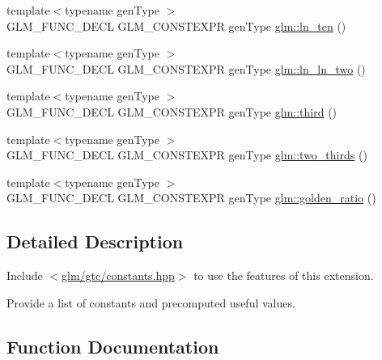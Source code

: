 \begin{DoxyCompactItemize}
{\footnotesize template$<$typename gen\+Type $>$ }\\G\+L\+M\+\_\+\+F\+U\+N\+C\+\_\+\+D\+E\+CL G\+L\+M\+\_\+\+C\+O\+N\+S\+T\+E\+X\+PR gen\+Type \hyperlink{group__gtc__constants_gaf97ebc6c059ffd788e6c4946f71ef66c}{glm\+::ln\+\_\+ten} ()
\item 
{\footnotesize template$<$typename gen\+Type $>$ }\\G\+L\+M\+\_\+\+F\+U\+N\+C\+\_\+\+D\+E\+CL G\+L\+M\+\_\+\+C\+O\+N\+S\+T\+E\+X\+PR gen\+Type \hyperlink{group__gtc__constants_gaca94292c839ed31a405ab7a81ae7e850}{glm\+::ln\+\_\+ln\+\_\+two} ()
\item 
{\footnotesize template$<$typename gen\+Type $>$ }\\G\+L\+M\+\_\+\+F\+U\+N\+C\+\_\+\+D\+E\+CL G\+L\+M\+\_\+\+C\+O\+N\+S\+T\+E\+X\+PR gen\+Type \hyperlink{group__gtc__constants_ga3077c6311010a214b69ddc8214ec13b5}{glm\+::third} ()
\item 
{\footnotesize template$<$typename gen\+Type $>$ }\\G\+L\+M\+\_\+\+F\+U\+N\+C\+\_\+\+D\+E\+CL G\+L\+M\+\_\+\+C\+O\+N\+S\+T\+E\+X\+PR gen\+Type \hyperlink{group__gtc__constants_ga9b4d2f4322edcf63a6737b92a29dd1f5}{glm\+::two\+\_\+thirds} ()
\item 
{\footnotesize template$<$typename gen\+Type $>$ }\\G\+L\+M\+\_\+\+F\+U\+N\+C\+\_\+\+D\+E\+CL G\+L\+M\+\_\+\+C\+O\+N\+S\+T\+E\+X\+PR gen\+Type \hyperlink{group__gtc__constants_ga748cf8642830657c5b7eae04d0a80899}{glm\+::golden\+\_\+ratio} ()
\end{DoxyCompactItemize}


\subsection{Detailed Description}
Include $<$\hyperlink{constants_8hpp}{glm/gtc/constants.\+hpp}$>$ to use the features of this extension.

Provide a list of constants and precomputed useful values. 

\subsection{Function Documentation}
\mbox{\label{group__gtc__constants_ga4b7956eb6e2fbedfc7cf2e46e85c5139}} 
